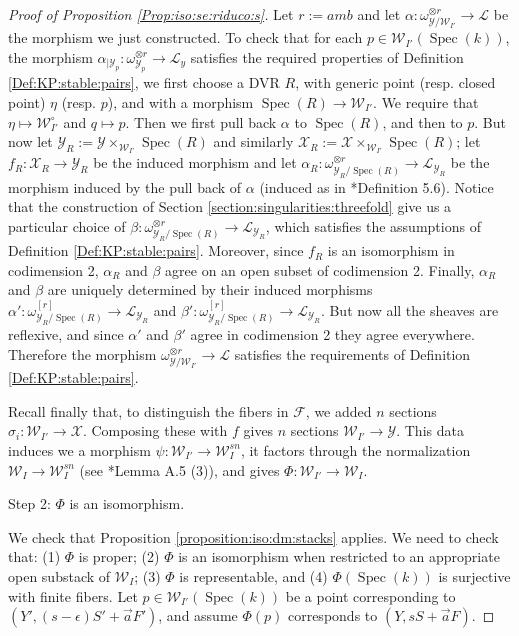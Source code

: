 \documentclass[11pt]{amsart}
\newcommand{\cE}{\mathcal{W}}
\newcommand{\sF}{\mathscr{F}}
\newcommand{\sL}{\mathscr{L}}
\newcommand{\sX}{\mathscr{X}}
\newcommand{\spec}{\operatorname{Spec}}
\newcommand{\sY}{\mathscr{Y}}
\theoremstyle{definition}
\begin{document}
\begin{proof}[Proof of Proposition \ref{Prop:iso:se:riduco:s}]
 
 Let $r:=amb$ and let $\alpha:\omega_{\sY/\cE_{I'}}^{\otimes r} \to \sL$ be the morphism we just constructed.
To check that for each $p \in \cE_{I'}(\spec(k))$, the morphism $\alpha_{|\sY_p}:\omega_{\sY_p}^{\otimes r} \to \sL_y$ satisfies the required properties of Definition \ref{Def:KP:stable:pairs}, we first
choose a DVR $R$, with generic point (resp. closed point) $\eta$ (resp. $p$), and with a morphism $\spec(R) \to \cE_{I'}$. We require that $\eta \mapsto \cE_{I'}^\circ$ and $q \mapsto p$. Then we first pull back $\alpha$ to $\spec(R)$, and then to $p$. But now let $\sY_R:=\sY \times_{\cE_{I'}}\spec(R)$ and similarly
$\sX_R:=\sX \times_{\cE_{I'}}\spec(R)$; let $f_R:\sX_R \to \sY_R$ be the induced morphism and let
$\alpha_R:\omega_{\sY_R/\spec(R)}^{\otimes r} \to \sL_{\sY_R}$ be the morphism induced by the pull back of $\alpha$ (induced as in \cite{KP}*{Definition 5.6}). Notice that the construction of Section \ref{section:singularities:threefold} give us a particular choice of $\beta:\omega_{\sY_R/\spec(R)}^{\otimes r} \to \sL_{\sY_R}$, which satisfies the assumptions of Definition \ref{Def:KP:stable:pairs}.
Moreover, since $f_R$ is an isomorphism in codimension 2, $\alpha_R$ and $\beta$ agree on an open subset of codimension 2. Finally, $\alpha_R$ and $\beta$ are uniquely determined by their induced morphisms $\alpha':\omega_{\sY_R/\spec(R)}^{[r]} \to \sL_{\sY_R}$ and $\beta':\omega_{\sY_R/\spec(R)}^{[r]} \to \sL_{\sY_R}$. But now all the sheaves are reflexive, and since $\alpha'$ and $\beta'$ agree in codimension 2 they agree everywhere.
Therefore the morphism $\omega_{\sY/\cE_{I'}}^{\otimes r} \to \sL$ satisfies the requirements of Definition \ref{Def:KP:stable:pairs}.

Recall finally that, to distinguish the fibers in $\sF$, we added $n$ sections $\sigma_i:\cE_{I'} \to \sX$. Composing these with $f$ gives $n$ sections $\cE_{I'} \to \sY$. This data induces we a morphism $\psi:\cE_{I'} \to \cE_{I}^{sn}$, it factors through the normalization $\cE_{I} \to \cE_I^{sn}$ (see \cite{AB3}*{Lemma A.5 (3)}), and gives $\Phi:\cE_{I'} \to \cE_{I}$.
 
 \begin{bf} Step 2: $\Phi$ is an isomorphism. \end{bf} We check that Proposition \ref{proposition:iso:dm:stacks} applies. We need to check that:
 (1) $\Phi$ is proper; (2) $\Phi$ is an isomorphism when restricted to an appropriate open substack of
 $\cE_{I}$; (3) $\Phi$ is representable, and (4) $\Phi(\spec(k))$ is surjective with finite fibers. Let $p \in \cE_{I'}(\spec(k))$ be a point corresponding to
 $(Y',(s-\epsilon)S'+\vec{a}F')$, and assume $\Phi(p)$ corresponds to $(Y,sS+\vec{a}F)$.


\end{proof}
\end{document}
